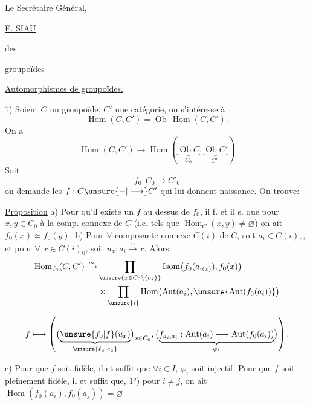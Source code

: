 Le Secrétaire Général,


\uline{E. SIAU}

 des

groupoïdes

\uline{Automorphismes de groupoïdes.}

1) Soient $C$  un groupoïde,
$C'$ une catégorie, on s'intéresse
à
\[
\operatorname{Hom}(C,C')=\operatorname{Ob}\,\underline{\operatorname{Hom}}(C,C').
\]
On a
\[
\operatorname{Hom}(C,C')\longrightarrow
\operatorname{Hom}(\underbrace{\operatorname{Ob}C}_{C_0},\underbrace{\operatorname{Ob}C'}_{C'_0})
\]
Soit
\[
f_0:C_0\longrightarrow C'_0
\]
on demande les $f:C\unsure{-|\longrightarrow}C'$ qui
lui donnent naissance. On trouve:

\uline{Proposition} a) Pour qu'il existe un
$f$ au dessus de $f_0$, il f. et il s.
que pour $x,y\in C_0$  à
la  comp. connexe de $C$
(i.e. tels que $\operatorname{Hom}_C(x,y)\ne\varnothing$) on ait
$f_0(x)\simeq f_0(y)$.
b) Pour $\forall$ composante
connexe $C(i)$ de $C$, soit $a_i\in C(i)_0$,
et pour $\forall$ $x\in C(i)_0$, soit
$u_x:a_i\xrightarrow{\sim}x$. Alors
\[
\begin{aligned}
\operatorname{Hom}_{f_0}(C,C')\xrightarrow{\sim}
&\prod_{\unsure{x\in C_0\setminus\{a_i\}}}
\operatorname{Isom}\bigl(f_0(a_{i(x)}),f_0(x)\bigr)\\
&\times\prod_{\unsure{i}}\operatorname{Hom}\bigl(\operatorname{Aut}(a_i),\unsure{\operatorname{Aut}(f_0(a_i))}\bigr)
\end{aligned}
\]

\[
f\longmapsto\left(
\bigl(\underbrace{\unsure{f_0|f}(u_x)}_{\unsure{\ell_x|e_x}}\bigr)_{x\in C_0},
\bigl(\underbrace{f_{a_i,a_i}:\operatorname{Aut}(a_i)\longrightarrow\operatorname{Aut}(f_0(a_i))}_{\varphi_i}\bigr)
\right).
\]

c) Pour que $f$ soit fidèle, il  et
suffit que $\forall i\in I$, $\varphi_i$ soit injectif.
Pour que $f$ soit pleinement fidèle,
il  et suffit que, 1°) pour $i\ne j$,
on ait $\operatorname{Hom}(f_0(a_i),f_0(a_j))=\varnothing$

